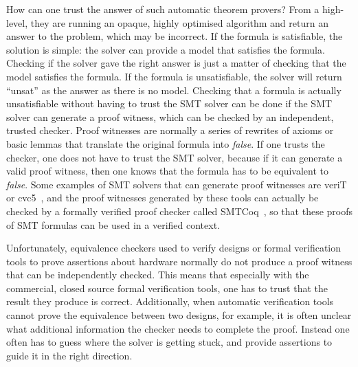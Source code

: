 How can one trust the answer of such automatic theorem provers?  From a
high-level, they are running an opaque, highly optimised algorithm and return an
answer to the problem, which may be incorrect.  If the formula is satisfiable,
the solution is simple: the solver can provide a model that satisfies the
formula.  Checking if the solver gave the right answer is just a matter of
checking that the model satisfies the formula.  If the formula is unsatisfiable,
the solver will return \enquote{unsat} as the answer as there is no model.
Checking that a formula is actually unsatisfiable without having to trust the
\gls{SMT} solver can be done if the \gls{SMT} solver can generate a proof
witness, which can be checked by an independent, trusted checker.  Proof
witnesses are normally a series of rewrites of axioms or basic lemmas that
translate the original formula into \textit{false}.  If one trusts the checker,
one does not have to trust the \gls{SMT} solver, because if it can generate a
valid proof witness, then one knows that the formula has to be equivalent to
\textit{false}.  Some examples of \gls{SMT} solvers that can generate proof
witnesses are veriT~\cite{bouton09} or cvc5~\cite[]{barbosa22_cvc5}, and the
proof witnesses generated by these tools can actually be checked by a formally
verified proof checker called SMTCoq~\cite{armand11_modul_integ_sat_smt_solver},
so that these proofs of \gls{SMT} formulas can be used in a verified context.

Unfortunately, equivalence checkers used to verify designs or formal
verification tools to prove assertions about hardware normally do not produce a
proof witness that can be independently checked.  This means that especially
with the commercial, closed source formal verification tools, one has to trust
that the result they produce is correct.  Additionally, when automatic
verification tools cannot prove the equivalence between two designs, for
example, it is often unclear what additional information the checker needs to
complete the proof.  Instead one often has to guess where the solver is getting
stuck, and provide assertions to guide it in the right direction.

%

